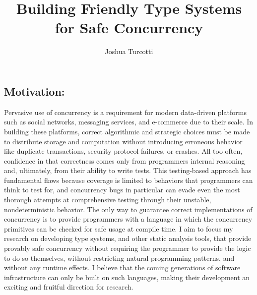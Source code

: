 \documentclass{nsf-grfp}
\title{Building Friendly Type Systems for Safe Concurrency}
\author{Joshua Turcotti}
\begin{document}
\maketitle

\subsection*{Motivation:} Pervasive use of concurrency is a requirement for modern data-driven platforms such as social networks, messaging services, and e-commerce due to their scale. In building these platforms, correct algorithmic and strategic choices must be made to distribute storage and computation without introducing erroneous behavior like duplicate transactions, security protocol failures, or crashes. All too often, confidence in that correctness comes only from programmers internal reasoning and, ultimately, from their ability to write tests. This testing-based approach has fundamental flaws because coverage is limited to behaviors that programmers can think to test for, and concurrency bugs in particular can evade even the most thorough attempts at comprehensive testing through their unstable, nondeterministic behavior. The only way to guarantee correct implementations of concurrency is to provide programmers with a language in which the concurrency primitives can be checked for safe usage at compile time. I aim to focus my research on developing type systems, and other static analysis tools, that provide provably safe concurrency without requiring the programmer to provide the logic to do so themselves, without restricting natural programming patterns, and without any runtime effects. I believe that the coming generations of software infrastructure can only be built on such languages, making their development an exciting and fruitful direction for research.
\end{document}
